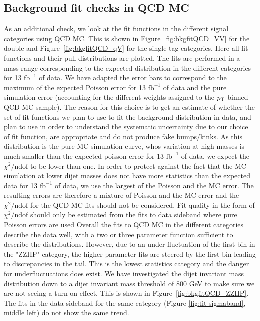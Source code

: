 \subsection{Background fit checks in QCD MC}
\label{sec:app:2016:mcfit}
As an additional check, we look at the fit functions in the different signal categories using QCD MC. This is shown in Figure~\ref{fig:bkgfitQCD_VV} for the double and Figure~\ref{fig:bkgfitQCD_qV} for the single tag categories. Here all fit functions and their pull distributions are plotted. The fits are performed in a mass range corresponding to the expected distribution in the different categories for 13 $\textrm{fb}^{-1}$ of data. We have adapted the error bars to correspond to the maximum of the expected Poisson error for 13 $\textrm{fb}^{-1}$ of data and the pure simulation error (accounting for the different weights assigned to the $p_{\mathrm{T}}$-binned QCD MC sample). The reason for this choice is to get an estimate of whether the set of fit functions we plan to use to fit the background distribution in data, and plan to use in order to understand the systematic uncertainty due to our choice of fit function, are appropriate and do not produce fake bumps/kinks. As this distribution is the pure MC simulation curve, whos variation at high masses is much smaller than the expected poisson error for 13 $\textrm{fb}^{-1}$ of data, we expect the $\chi^{2}/\textrm{ndof}$ to be lower than one. In order to protect against the fact that the MC simulation at lower dijet masses does not have more statistics than the expected data for 13 $\textrm{fb}^{-1}$ of data, we use the largest of the Poisson and the MC error. The resulting errors are therefore a mixture of Poisson and the MC error and the $\chi^{2}/\textrm{ndof}$ for the QCD MC fits should not be considered. Fit quality in the form of $\chi^{2}/\textrm{ndof}$ should only be estimated from the fits to data sideband where pure Poisson errors are used
Overall the fits to QCD MC in the different categories describe the data well, with a two or three parameter function sufficient to describe the distributions. However, due to an under fluctuation of the first bin in the "ZZHP" category, the higher parameter fits are steered by the first bin leading to discrepancies in the tail. This is the lowest statistics category and the danger for underfluctuations does exist. We have investigated the dijet invariant mass distribution down to a dijet invariant mass threshold of 800 GeV to make sure we are not seeing a turn-on effect. This is shown in Figure~\ref{fig:bkgfitQCD_ZZHP}. The fits in the data sideband for the same category (Figure \ref{fig:fit-sigmaband}, middle left) do not show the same trend.

